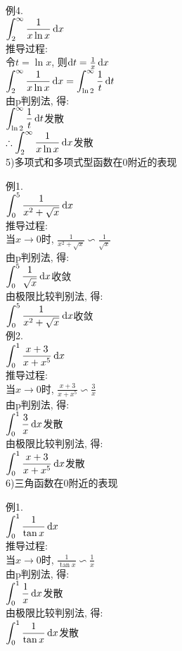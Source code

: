 例4.\\
\phantom{例}$\displaystyle\int_2^\infty\frac{1}{x\ln x}\mathop{}\!\mathrm{d} x$\\
推导过程:\\
令$t=\ln x$, 则$\mathop{}\!\mathrm{d} t=\frac{1}{x}\mathop{}\!\mathrm{d} x$\\
$\displaystyle\int_2^\infty\frac{1}{x\ln x}\mathop{}\!\mathrm{d} x=\int_{\ln 2}^\infty\frac{1}{t}\mathop{}\!\mathrm{d} t$\\
由p判别法, 得:\\
$\displaystyle\int_{\ln 2}^\infty\frac{1}{t}\mathop{}\!\mathrm{d} t$发散\\
$\displaystyle\therefore\int_2^\infty\frac{1}{x\ln x}\mathop{}\!\mathrm{d} x$发散\\[2ex]

5)多项式和多项式型函数在0附近的表现
\begin{center}
\end{center}

例1.\\
\phantom{例}$\displaystyle\int_0^5\frac{1}{x^2+\sqrt{x}}\mathop{}\!\mathrm{d} x$\\
推导过程:\\
当$x\to 0$时, $\displaystyle\frac{1}{x^2+\sqrt{x}}\backsim\frac{1}{\sqrt{x}}$\\
由p判别法, 得:\\
$\displaystyle\int_0^5\frac{1}{\sqrt{x}}\mathop{}\!\mathrm{d} x$收敛\\
由极限比较判别法, 得:\\
$\displaystyle\int_0^5\frac{1}{x^2+\sqrt{x}}\mathop{}\!\mathrm{d} x$收敛\\[1ex]

例2.\\
\phantom{例}$\displaystyle\int_0^1\frac{x+3}{x+x^5}\mathop{}\!\mathrm{d} x$\\
推导过程:\\
当$x\to 0$时, $\displaystyle\frac{x+3}{x+x^5}\backsim\frac{3}{x}$\\
由p判别法, 得:\\
$\displaystyle\int_0^1\frac{3}{x}\mathop{}\!\mathrm{d} x$发散\\
由极限比较判别法, 得:\\
$\displaystyle\int_0^1\frac{x+3}{x+x^5}\mathop{}\!\mathrm{d} x$发散\\[2ex]

6)三角函数在0附近的表现
\begin{center}
\end{center}

例1.\\
\phantom{例}$\displaystyle\int_0^1\frac{1}{\tan x}\mathop{}\!\mathrm{d} x$\\
推导过程:\\
当$x\to 0$时, $\displaystyle\frac{1}{\tan x}\backsim\frac{1}{x}$\\
由p判别法, 得:\\
$\displaystyle\int_0^1\frac{1}{x}\mathop{}\!\mathrm{d} x$发散\\
由极限比较判别法, 得:\\
$\displaystyle\int_0^1\frac{1}{\tan x}\mathop{}\!\mathrm{d} x$发散\\[1ex]


